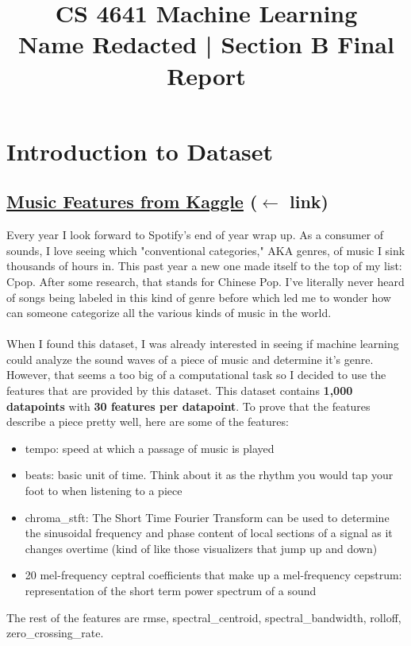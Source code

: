 \documentclass[12pt]{article}
\title{CS 4641 Machine Learning \\ Name Redacted | Section B Final Report}
\date{}
\author{}
\begin{document}
\maketitle

\section{Introduction to Dataset}
\subsection{\href{https://www.kaggle.com/insiyeah/musicfeatures}{Music Features from Kaggle} ($\leftarrow$ link)}
Every year I look forward to Spotify's end of year wrap up. As a consumer of sounds, I love seeing which "conventional categories," AKA genres, of music I sink thousands of hours in. This past year a new one made itself to the top of my list: Cpop. After some research, that stands for Chinese Pop. I've literally never heard of songs being labeled in this kind of genre before which led me to wonder how can someone categorize all the various kinds of music in the world. 
\\ \\
When I found this dataset, I was already interested in seeing if machine learning could analyze the sound waves of a piece of music and determine it's genre. However, that seems a too big of a computational task so I decided to use the features that are provided by this dataset. This dataset contains \textbf{1,000 datapoints} with \textbf{30 features per datapoint}. To prove that the features describe a piece pretty well, here are some of the features:
\begin{itemize}
    \item tempo: speed at which a passage of music is played
    \item beats: basic unit of time. Think about it as the rhythm you would tap your foot to when listening to a piece
    \item chroma\_stft: The Short Time Fourier Transform can be used to determine the sinusoidal frequency and phase content of local sections of a signal as it changes overtime (kind of like those visualizers that jump up and down)
    \item 20 mel-frequency ceptral coefficients that make up a mel-frequency cepstrum: representation of the short term power spectrum of a sound
\end{itemize}
The rest of the features are rmse, spectral\_centroid, spectral\_bandwidth, rolloff, zero\_crossing\_rate.
\end{document}
